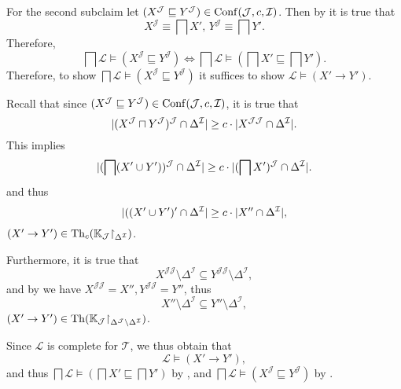 \begin{Proof}
  For the second subclaim let $(X^{\mathcal{J}} \sqsubseteq Y^{\mathcal{J}}) \in
  \operatorname{Conf}(\mathcal{J}, c, \mathcal{I})$.  Then by  it is
  true that
  \begin{equation*}
    X^{\mathcal{J}} \equiv \bigsqcap X',\, Y^{\mathcal{J}} \equiv \bigsqcap Y'.
  \end{equation*}
  Therefore,
  \begin{equation}
    \label{eq:51}
    \bigsqcap \mathcal{L} \models (X^{\mathcal{J}} \sqsubseteq Y^{\mathcal{J}}) \iff \bigsqcap
    \mathcal{L} \models (\bigsqcap X' \sqsubseteq \bigsqcap Y').
  \end{equation}
  Therefore, to show $\bigsqcap \mathcal{L} \models (X^{\mathcal{J}} \sqsubseteq
  Y^{\mathcal{J}})$ it suffices to show $\mathcal{L} \models (X' \to Y')$.

  Recall that since $(X^{\mathcal{J}} \sqsubseteq Y^{\mathcal{J}}) \in \operatorname{Conf}(\mathcal{J},
  c, \mathcal{I})$, it is true that
  \begin{equation*}
    \lvert (X^{\mathcal{J}} \sqcap Y^{\mathcal{J}})^{\mathcal{J}} \cap \Delta^{\mathcal{I}}
      \rvert \ge c \cdot \lvert X^{\mathcal{J}\mathcal{J}} \cap \Delta^{\mathcal{I}} \rvert.
  \end{equation*}
  This implies
  \begin{equation*}
    \lvert (\bigsqcap (X' \cup Y'))^{\mathcal{J}} \cap \Delta^{\mathcal{I}}
      \rvert \ge c \cdot \lvert (\bigsqcap X')^{\mathcal{J}} \cap \Delta^{\mathcal{I}} \rvert.
  \end{equation*}
  and thus
  \begin{equation*}
    \lvert ((X' \cup Y')' \cap \Delta^{\mathcal{I}} \rvert \ge c \cdot \lvert X''
      \cap \Delta^{\mathcal{I}}\rvert,
  \end{equation*}
  \ie $(X' \to Y') \in \operatorname{Th}_{c}({\mathbb{K}}_{\mathcal{J}} \mathord{\upharpoonright}_{\Delta^{\mathcal{I}}})$.

  Furthermore, it is true that
  \begin{equation*}
    X^{\mathcal{J}\mathcal{J}} \setminus \Delta^{\mathcal{I}} \subseteq Y^{\mathcal{J}\mathcal{J}} \setminus
    \Delta^{\mathcal{I}},
  \end{equation*}
  and by  we have $X^{\mathcal{J}\mathcal{J}} = X'',
  Y^{\mathcal{J}\mathcal{J}} = Y''$, thus
  \begin{equation*}
    X'' \setminus \Delta^{\mathcal{I}} \subseteq Y'' \setminus \Delta^{\mathcal{I}},
  \end{equation*}
  \ie $(X' \to Y') \in \operatorname{Th}({\mathbb{K}}_{\mathcal{J}} \mathord{\upharpoonright}_{\Delta^{\mathcal{J}} \setminus
    \Delta^{\mathcal{I}}})$.

  Since $\mathcal{L}$ is complete for $\mathcal{T}$, we thus obtain that
  \begin{equation*}
    \mathcal{L} \models (X' \to Y'),
  \end{equation*}
  and thus $\bigsqcap \mathcal{L} \models (\bigsqcap X' \sqsubseteq \bigsqcap Y')$ by
  , and $\bigsqcap \mathcal{L}
  \models (X^{\mathcal{J}} \sqsubseteq Y^{\mathcal{J}})$ by .
\end{Proof}

